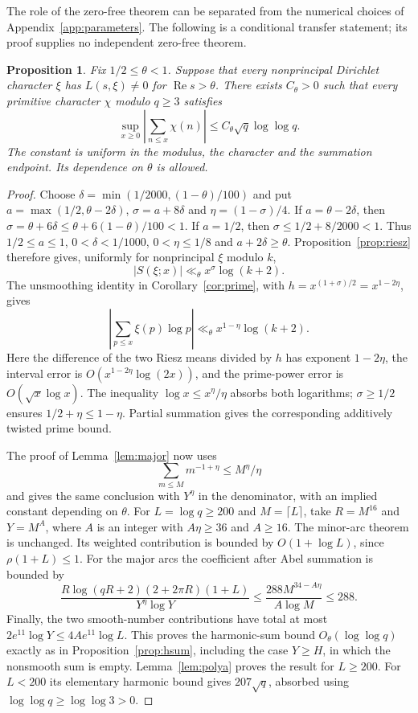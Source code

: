 \documentclass[screen,reqno]{aomart}
\numberwithin{equation}{section}
\newtheorem{proposition}[theorem]{Proposition}
\theoremstyle{definition}
\renewcommand{\Re}{\operatorname{Re}}
\begin{document}
The role of the zero-free theorem can be separated from the numerical
choices of Appendix~\ref{app:parameters}. The following is a conditional
transfer statement; its proof supplies no independent zero-free theorem.

\begin{proposition}\label{prop:fixedboundary}
Fix $1/2\le\theta<1$. Suppose that every nonprincipal Dirichlet character
$\xi$ has $L(s,\xi)\ne0$ for $\Re s>\theta$. There exists $C_\theta>0$
such that every primitive character $\chi$ modulo $q\ge3$ satisfies
\[
 \sup_{x\ge0}\left|\sum_{n\le x}\chi(n)\right|
 \le C_\theta\sqrt q\log\log q.
\]
The constant is uniform in the modulus, the character and the summation
endpoint. Its dependence on $\theta$ is allowed.
\end{proposition}

\begin{proof}
Choose $\delta=\min(1/2000,(1-\theta)/100)$ and put
$a=\max(1/2,\theta-2\delta)$, $\sigma=a+8\delta$ and
$\eta=(1-\sigma)/4$. If $a=\theta-2\delta$, then
$\sigma=\theta+6\delta\le\theta+6(1-\theta)/100<1$.
If $a=1/2$, then $\sigma\le1/2+8/2000<1$.
Thus $1/2\le a\le1$, $0<\delta<1/1000$, $0<\eta\le1/8$ and
$a+2\delta\ge\theta$. Proposition~\ref{prop:riesz} therefore gives,
uniformly for nonprincipal $\xi$ modulo $k$,
\[
 |S(\xi;x)|\ll_\theta x^\sigma\log(k+2).
\]
The unsmoothing identity in Corollary~\ref{cor:prime}, with
$h=x^{(1+\sigma)/2}=x^{1-2\eta}$, gives
\[
 \left|\sum_{p\le x}\xi(p)\log p\right|
 \ll_\theta x^{1-\eta}\log(k+2).
\]
Here the difference of the two Riesz means divided by $h$ has exponent
$1-2\eta$, the interval error is $O(x^{1-2\eta}\log(2x))$, and the
prime-power error is $O(\sqrt x\log x)$. The inequality
$\log x\le x^\eta/\eta$ absorbs both logarithms; $\sigma\ge1/2$
ensures $1/2+\eta\le1-\eta$. Partial summation gives the corresponding
additively twisted prime bound.

The proof of Lemma~\ref{lem:major} now uses
\[
 \sum_{m\le M}m^{-1+\eta}\le M^\eta/\eta
\]
and gives the same conclusion with $Y^\eta$ in the denominator,
with an implied constant depending on $\theta$. For $L=\log q\ge200$
and $M=\lceil L\rceil$, take $R=M^{16}$ and $Y=M^A$, where $A$ is
an integer with $A\eta\ge36$ and $A\ge16$.
The minor-arc theorem is unchanged. Its weighted contribution is bounded
by $O(1+\log L)$, since $\rho(1+L)\le1$. For the major arcs the
coefficient after Abel summation is bounded by
\[
 \frac{R\log(qR+2)(2+2\pi R)(1+L)}{Y^\eta\log Y}
 \le \frac{288 M^{34-A\eta}}{A\log M}\le288.
\]
Finally, the two smooth-number contributions have total at most
$2e^{11}\log Y\le4Ae^{11}\log L$. This proves the harmonic-sum
bound $O_\theta(\log\log q)$ exactly as in
Proposition~\ref{prop:hsum}, including the case $Y\ge H$, in which
the nonsmooth sum is empty. Lemma~\ref{lem:polya} proves the result
for $L\ge200$. For $L<200$ its elementary harmonic bound gives
$207\sqrt q$, absorbed using $\log\log q\ge\log\log3>0$.
\end{proof}
\end{document}

